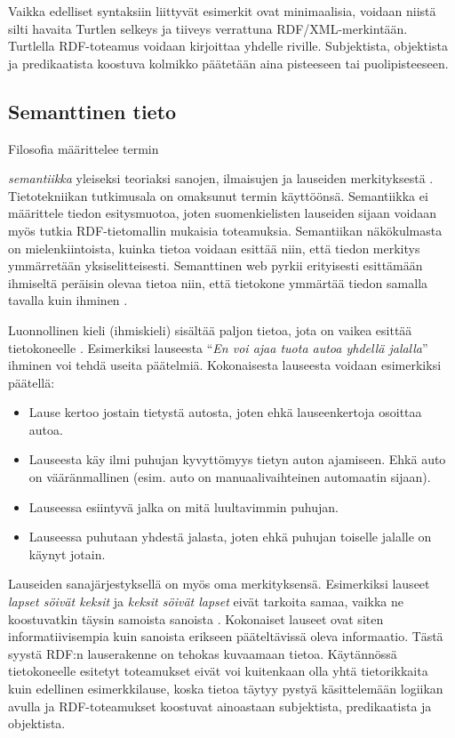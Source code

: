 \documentclass[finnish, 12pt, a4paper, elec, utf8, pdfa, online]{aaltothesis}
\begin{document}
Vaikka edelliset syntaksiin liittyvät esimerkit ovat minimaalisia, voidaan niistä silti havaita Turtlen selkeys ja tiiveys verrattuna RDF/XML-merkintään. Turtlella RDF-toteamus voidaan kirjoittaa yhdelle riville. Subjektista, objektista ja predikaatista koostuva kolmikko päätetään aina pisteeseen tai puolipisteeseen.

\subsection{Semanttinen tieto}
Filosofia määrittelee termin {\textit{semantiikka} yleiseksi teoriaksi sanojen, ilmaisujen ja lauseiden merkityksestä \cite{semantics_phi}. Tietotekniikan tutkimusala on omaksunut termin käyttöönsä. Semantiikka ei määrittele tiedon esitysmuotoa, joten suomenkielisten lauseiden sijaan voidaan myös tutkia RDF-tietomallin mukaisia toteamuksia. Semantiikan näkökulmasta on mielenkiintoista, kuinka tietoa voidaan esittää niin, että tiedon merkitys ymmärretään yksiselitteisesti. Semanttinen web pyrkii erityisesti esittämään ihmiseltä peräisin olevaa tietoa niin, että tietokone ymmärtää tiedon samalla tavalla kuin ihminen \cite{Berners_visio}.

Luonnollinen kieli (ihmiskieli) sisältää paljon tietoa, jota on vaikea esittää tietokoneelle \cite{semantics}. Esimerkiksi lauseesta ``\textit{En voi ajaa tuota autoa yhdellä jalalla}'' ihminen voi tehdä useita päätelmiä. Kokonaisesta lauseesta voidaan esimerkiksi päätellä:
\begin{itemize}
  \item  Lause kertoo jostain tietystä autosta, joten ehkä lauseenkertoja osoittaa autoa.
  \item  Lauseesta käy ilmi puhujan kyvyttömyys tietyn auton ajamiseen. Ehkä auto on vääränmallinen (esim. auto on manuaalivaihteinen automaatin sijaan).
  \item  Lauseessa esiintyvä jalka on mitä luultavimmin puhujan.
  \item  Lauseessa puhutaan yhdestä jalasta, joten ehkä puhujan toiselle jalalle on käynyt jotain.
\end{itemize}
Lauseiden sanajärjestyksellä on myös oma merkityksensä. Esimerkiksi lauseet \textit{lapset söivät keksit} ja \textit{keksit söivät lapset} eivät tarkoita samaa, vaikka ne koostuvatkin täysin samoista sanoista \cite{semantics}. Kokonaiset lauseet ovat siten informatiivisempia kuin sanoista erikseen pääteltävissä oleva informaatio. Tästä syystä RDF:n lauserakenne on tehokas kuvaamaan tietoa. Käytännössä tietokoneelle esitetyt toteamukset eivät voi kuitenkaan olla yhtä tietorikkaita kuin edellinen esimerkkilause, koska tietoa täytyy pystyä käsittelemään logiikan avulla ja RDF-toteamukset koostuvat ainoastaan subjektista, predikaatista ja objektista.

}
\end{document}

